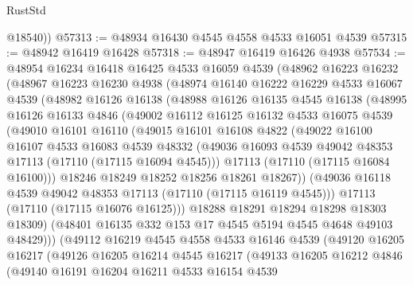 \begin{lexlean}{RustStd}
\begin{coremodule}
        @18540))
@57313 := @48934 @16430 @4545 @4558 @4533 @16051 @4539
@57315 := @48942 @16419 @16428
@57318 := @48947 @16419 @16426 @4938
@57534 := @48954
    @16234
    @16418
    @16425
    @4533
    @16059
    @4539
    (@48962
      @16223
      @16232
      (@48967
        @16223
        @16230
        @4938
        (@48974
          @16140
          @16222
          @16229
          @4533
          @16067
          @4539
          (@48982
            @16126
            @16138
            (@48988
              @16126
              @16135
              @4545
              @16138
              (@48995
                @16126
                @16133
                @4846
                (@49002
                  @16112
                  @16125
                  @16132
                  @4533
                  @16075
                  @4539
                  (@49010
                    @16101
                    @16110
                    (@49015
                      @16101
                      @16108
                      @4822
                      (@49022
                        @16100
                        @16107
                        @4533
                        @16083
                        @4539
                        @48332
                        (@49036 @16093 @4539 @49042 @48353 @17113 (@17110 (@17115 @16094 @4545)))
                        @17113
                        (@17110 (@17115 @16084 @16100)))
                      @18246
                      @18249
                      @18252
                      @18256
                      @18261
                      @18267))
                  (@49036 @16118 @4539 @49042 @48353 @17113 (@17110 (@17115 @16119 @4545)))
                  @17113
                  (@17110 (@17115 @16076 @16125)))
                @18288
                @18291
                @18294
                @18298
                @18303
                @18309)
              (@48401 @16135 @332 @153 @17 @4545 @5194 @4545 @4648 @49103 @48429)))
          (@49112
            @16219
            @4545
            @4558
            @4533
            @16146
            @4539
            (@49120
              @16205
              @16217
              (@49126
                @16205
                @16214
                @4545
                @16217
                (@49133
                  @16205
                  @16212
                  @4846
                  (@49140
                    @16191
                    @16204
                    @16211
                    @4533
                    @16154
                    @4539

\end{coremodule}
\end{lexlean}
